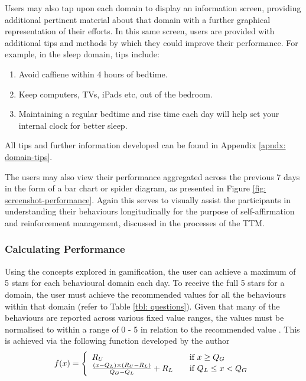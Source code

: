 Users may also tap upon each domain to display an information screen, providing additional pertinent material about that domain with a further graphical representation of their efforts. In this same screen, users are provided with additional tips and methods by which they could improve their performance. For example, in the sleep domain, tips include:
\begin{enumerate}[noitemsep,topsep=0pt]
\item Avoid caffiene within 4 hours of bedtime.
\item Keep computers, TVs, iPads etc, out of the bedroom.
\item Maintaining a regular bedtime and rise time each day will help set your internal clock for better sleep.
\end{enumerate}

All tips and further information developed can be found in Appendix \ref{apndx: domain-tips}.

The users may also view their performance aggregated across the previous 7 days in the form of a bar chart or spider diagram, as presented in Figure \ref{fig: screenshot-performance}. Again this serves to visually assist the participants in understanding their behaviours longitudinally for the purpose of self-affirmation and reinforcement management, discussed in the processes of the TTM.

\subsubsection{Calculating Performance} \label{subsubsection-calculating-performance}
Using the concepts explored in gamification, the user can achieve a maximum of 5 stars for each behavioural domain each day. To receive the full 5 stars for a domain, the user must achieve the recommended values for all the behaviours within that domain (refer to Table \ref{tbl: questions}). Given that many of the behaviours are reported across various fixed value ranges, the values must be normalised to within a range of 0 - 5 in relation to the recommended value \cite{Hartin2014-IWAAL}. This is achieved via the following function developed by the author
\begin{equation}
f(x) = \left\{
         \begin{array}{l l}

         R_{U} & \quad
           \text{if }{x \geq Q_{G} }\\

           \frac{
           \left(x-Q_{L}\right)\times\left(R_{U}-R_{L}\right)}
           {Q_{G}-Q_{L}}
           + R_{L} & \quad
           \text{if }{Q_{L} \leq x < Q_{G}}\\

          \end{array}
          \right.
          \label{eq: calc-performance-stars}
\end{equation}

